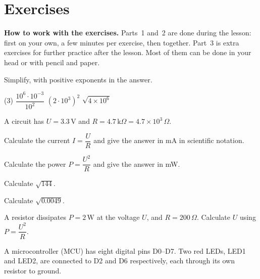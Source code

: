 
\section{Exercises}
\label{c6:sec:uppgifter}

\begin{aside}
\textbf{How to work with the exercises.} Parts~1 and~2 are done during the lesson: first on your
own, a few minutes per exercise, then together. Part~3 is extra exercises for further practice
after the lesson. Most of them can be done in your head or with pencil and paper.

\end{aside}


Simplify, with positive exponents in the answer.
\begin{delar}(3)
  \task $\dfrac{10^6 \cdot 10^{-3}}{10^2}$
  \task $(2 \cdot 10^3)^2$
  \task $\sqrt{4 \times 10^6}$
\end{delar}

A circuit has $U = 3.3\,\text{V}$ and $R = 4.7\,\text{k}\Omega = 4.7 \times 10^3\,\Omega$.
\begin{parts}
  \item Calculate the current $I = \dfrac{U}{R}$ and give the answer in mA in scientific
    notation.
  \item Calculate the power $P = \dfrac{U^2}{R}$ and give the answer in mW.
\end{parts}

\begin{parts}
  \item Calculate $\sqrt{144}$.
  \item Calculate $\sqrt{0.0049}$.
  \item A resistor dissipates $P = 2\,\text{W}$ at the voltage $U$, and $R = 200\,\Omega$.
    Calculate $U$ using $P = \dfrac{U^2}{R}$.
\end{parts}

A microcontroller (MCU) has eight digital pins D0--D7. Two red LEDs, LED1 and LED2, are connected
to D2 and D6 respectively, each through its own resistor to ground.

